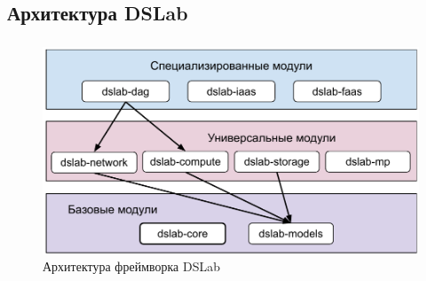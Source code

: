 \documentclass[t]{beamer}  %
\begin{document}
	
	\subsection{Архитектура DSLab}
	\begin{frame}[fragile]
		\frametitle{\insertsection} 
		\framesubtitle{\insertsubsection}
		\vspace{0.5cm}
		\begin{figure}[H]
			\centering
			\includegraphics[width=\linewidth]{images/dslab_arc}
			\caption*{Архитектура фреймворка DSLab}
		\end{figure}
	\end{frame}





		
		
\end{document}
